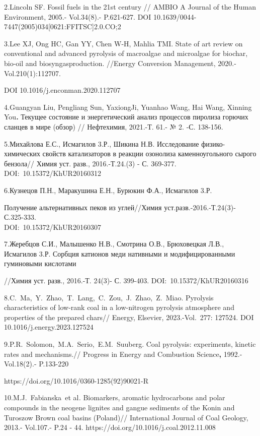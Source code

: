 2.Lincoln SF. Fossil fuels in the 21st century // AMBIO A Journal of the
Human Environment, 2005.- Vol.34(8).- P.621-627. DOI
10.1639/0044-7447(2005)034{[}0621:FFITSC{]}2.0.CO;2

3.Lee XJ, Ong HC, Gan YY, Chen W-H, Mahlia TMI. State of art review on
conventional and advanced pyrolysis of macroalgae and microalgae for
biochar, bio-oil and biosyngasproduction. //Energy Conversion
Management, 2020.-Vol.210(1):112707.

DOI 10.1016/j.enconman.2020.112707

4.Guangyan Liu, Pengliang Sun, YaxiongJi, Yuanhao Wang, Hai Wang,
Xinning You{\bfseries .} Текущее состояние и энергетический анализ
процессов пиролиза горючих сланцев в мире (обзор) // Нефтехимия,
2021.-Т. 61.- № 2. -С. 138-156.

5.Михайлова Е.С., Исмагилов 3.Р., Шикина Н.В. Исследование
физико-химических свойств катализаторов в реакции озонолиза
каменноугольного сырого бензола// Химия уст. разв., 2016.-Т.24.(3) - С.
369-377. DOI:~10.15372/KhUR20160312

6.Кузнецов П.Н., Маракушина Е.Н., Бурюкин Ф.А., Исмагилов 3.Р.

Получение альтернативных пеков из углей//Химия уст.разв.-2016.-Т.24(3)-
С.325-333.\\
DOI:~10.15372/KhUR20160307

7.Жеребцов С.И., Малышенко Н.В., Смотрина О.В., Брюховецкая Л.В.,
Исмагилов 3.Р. Сорбция катионов меди нативными и модифицированными
гуминовыми кислотами

//Химия уст. разв., 2016.-Т. 24(3)- С. 399-403.
DOI:~10.15372/KhUR20160316

8.C.~Ma,~Y.~Zhao,~T.~Lang,~C.~Zou,~J.~Zhao,~Z.~Miao. Pyrolysis
characteristics of low-rank coal in a low-nitrogen pyrolysis atmosphere
and properties of the prepared chars// Energy, Elsevier, 2023.-Vol.~277:
127524. DOI 10.1016/j.energy.2023.127524

9.P.R.~Solomon,~M.A.~Serio,~E.M.~Suuberg. Coal pyrolysis: experiments,
kinetic rates and mechanisms.// Progress in Energy and Combustion
Science{\bfseries ,} 1992.-Vol.18(2).- P.133-220

https://doi.org/10.1016/0360-1285(92)90021-R

10.M.J.~Fabianska\emph{~}et al\emph{.} Biomarkers, aromatic hydrocarbons
and polar compounds in the neogene lignites and gangue sediments of the
Konin and Turoszow Brown coal basins (Poland)// International Journal of
Coal Geology, 2013.- Vol.107.- P.24 - 44.
https://doi.org/10.1016/j.coal.2012.11.008

